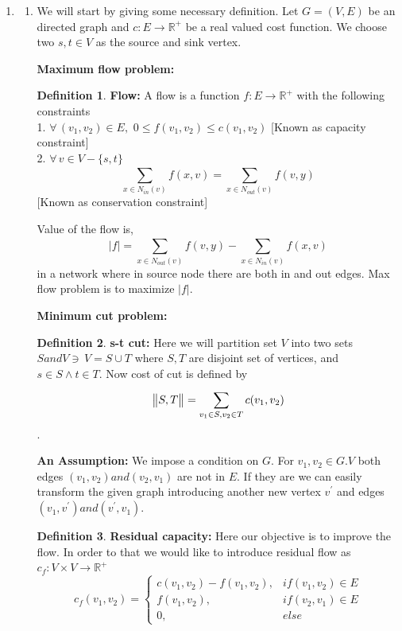 \documentclass[12pt,a4paper,final]{article}
\theoremstyle{definition}
\newtheorem{definition}{Definition}
\DeclarePairedDelimiter{\norm}{\lVert}{\rVert}
\begin{document}
\begin{enumerate}
\begin{enumerate}
\end{enumerate}


\item

\begin{enumerate}
\item
We will start by giving some necessary definition.
Let $G=(V,E)$ be an directed graph and $c: E \to \mathbb{R}^+$ be a real valued cost function. We choose two $s,t \in V$ as the source and sink vertex.

\textbf{Maximum flow problem: }
\begin{definition}
\textbf{Flow: }A flow is a function $f: E \to \mathbb{R}^+$ with the following constraints\\
1. $\forall\,(v_1,v_2)\in E,\,\, 0\leq f(v_1,v_2) \leq c(v_1,v_2)$ [Known as capacity constraint]\\
2. $\forall\, v \in V - \{s,t\}$
$$\sum_{x \in N_{in}(v)}^{} f(x,v) = \sum_{x \in N_{out}(v)}^{} f(v,y)$$
[Known as conservation constraint]
\end{definition}

Value of the flow is, $$|f| = \sum_{x \in N_{out}(v)}^{} f(v,y) - \sum_{x \in N_{in}(v)}^{} f(x,v)$$ in a network where in source node there are both in and out edges. Max flow problem is to maximize $|f|$.

\textbf{Minimum cut problem: }
\begin{definition}
\textbf{s-t cut: }Here we will partition set $V$ into two sets $S and V \ni \, V = S \cup T$ where $S, T$ are disjoint set of vertices, and $s \in S \land t \in T$. Now cost of cut is defined by $$\norm[\big]{S,T} = \sum_{v_1 \in S,v_2 \in T}^{} c(v_1,v_2)$$.
\end{definition}

\textbf{An Assumption: }We impose a condition on $G$. For $v_1,v_2 \in G.V$ both edges $(v_1,v_2) and (v_2,v_1)$ are not in $E$. If they are we can easily transform the given graph introducing another new vertex $v^\prime$ and edges $(v_1,v^\prime) and (v^\prime,v_1)$.



\begin{definition}
\textbf{Residual capacity: }Here our objective is to improve the flow. In order to that we would like to introduce residual flow as $c_f : V \times V \to \mathbb{R^+}$
\[
  c_f(v_1,v_2) =
  \begin{cases}
                      c(v_1,v_2) - f(v_1,v_2), & if (v_1,v_2) \in E \\
                      f(v_1,v_2),  & if (v_2,v_1) \in E\\
                      0, & else
  \end{cases}
\]
\end{definition}



\end{enumerate}
\end{enumerate}
\end{document}
